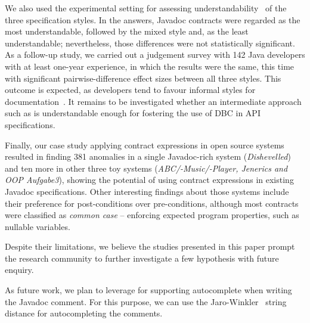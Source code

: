 We also used the experimental setting for assessing understandability~\cite{} of the three  specification styles. 
In the answers, Javadoc contracts were regarded as the most understandable, followed by the mixed \contractjdoc{} style and, as the least understandable; nevertheless, those differences were not statistically significant. As a follow-up study, we carried out a judgement survey with 142 Java developers with at least one-year experience, in which the results were the same, this time with significant pairwise-difference effect sizes between all three styles.
This outcome is expected, as developers tend to favour informal styles for documentation~\cite{}. It remains to be investigated whether an intermediate approach such as \contractjdoc{} is understandable enough for fostering the use of DBC in API specifications.

Finally, our case study applying contract expressions in open source systems resulted in finding 381 anomalies in a single Javadoc-rich system (\emph{Dishevelled}) and ten more in other three toy systems (\emph{ABC/-Music/-Player, Jenerics and OOP Aufgabe3}), showing the potential of using contract expressions in existing Javadoc specifications.
Other interesting findings about those systems include their preference for post-conditions over pre-conditions, although most contracts were classified as \emph{common case} -- enforcing expected program properties, such as nullable variables.

Despite their limitations, we believe the studies presented in this paper prompt the research community to further investigate a few hypothesis with future enquiry. 




As future work, we plan to leverage \contractjdoc{} for
supporting autocomplete when writing the Javadoc comment. For this purpose, we
can use the Jaro-Winkler~\cite{jaro,winkler99} string distance for
autocompleting the comments.






